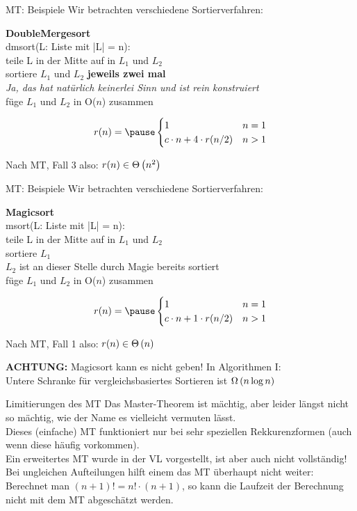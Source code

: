 \begin{frame}{MT: Beispiele}
	Wir betrachten verschiedene Sortierverfahren:\\
	\bigskip
	
	\textbf{DoubleMergesort}\\
	dmsort(L: Liste mit |L| = n):\\
	teile L in der Mitte auf in $L_1$ und $L_2$\\
	sortiere $L_1$ und $L_2$ \textbf{jeweils zwei mal}\\
	\textit{Ja, das hat natürlich keinerlei Sinn und ist rein konstruiert}\\
	füge $L_1$ und $L_2$ in O($n$) zusammen\\
	\medskip
	
	$$r(n) = \pause \begin{cases}
	1 & n = 1\\
	c \cdot n + 4 \cdot r(n/2) & n > 1
	\end{cases}$$
	
	\pause
	Nach MT, Fall 3 also: $r(n) \in \Theta\left(n^2\right)$
\end{frame}

\begin{frame}{MT: Beispiele}
	Wir betrachten verschiedene Sortierverfahren:\\
	\bigskip
	
	\textbf{Magicsort}\\
	msort(L: Liste mit |L| = n):\\
	teile L in der Mitte auf in $L_1$ und $L_2$\\
	sortiere $L_1$\\
	$L_2$ ist an dieser Stelle durch Magie bereits sortiert\\
	füge $L_1$ und $L_2$ in O($n$) zusammen\\
	\medskip
	
	$$r(n) = \pause \begin{cases}
	1 & n = 1\\
	c \cdot n + 1 \cdot r(n/2) & n > 1
	\end{cases}$$
	
	\pause
	Nach MT, Fall 1 also: $r(n) \in \Theta\left(n\right)$
	\medskip
	
	\textbf{ACHTUNG:} Magicsort kann es nicht geben! In Algorithmen I:\\ 
	Untere Schranke für vergleichsbasiertes Sortieren ist $\Omega\left(n \log n\right)$
\end{frame}


\begin{frame}{Limitierungen des MT}
	Das Master-Theorem ist mächtig, aber leider längst nicht so mächtig, wie der Name es vielleicht vermuten lässt.\\
	\pause
	Dieses (einfache) MT funktioniert nur bei sehr speziellen Rekkurenzformen (auch wenn diese häufig vorkommen).\\
	\pause
	Ein erweitertes MT wurde in der VL vorgestellt, ist aber auch nicht vollständig!\\
	\pause
	\medskip
	Bei ungleichen Aufteilungen hilft einem das MT überhaupt nicht weiter:\\
	Berechnet man $(n + 1)! = n! \cdot (n + 1)$, so kann die Laufzeit der Berechnung nicht mit dem MT abgeschätzt werden.
\end{frame}